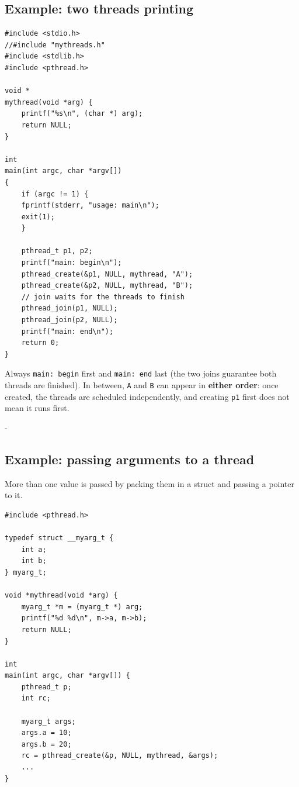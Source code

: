 \documentclass[11pt,a4paper]{article}
\makeatletter
\newcommand{\keepspace}[1]{\par\penalty-100\begingroup
  \setlength{\dimen@}{#1}\dimen@ii\pagegoal\advance\dimen@ii-\pagetotal
  \ifdim\dimen@>\dimen@ii\ifdim\dimen@ii>\z@\vfil\fi\break\fi\endgroup}
\makeatother
\begin{document}
\subsection{Example: two threads printing}

\begin{lstlisting}
#include <stdio.h>
//#include "mythreads.h"
#include <stdlib.h>
#include <pthread.h>

void *
mythread(void *arg) {
    printf("%s\n", (char *) arg);
    return NULL;
}

int
main(int argc, char *argv[])
{
    if (argc != 1) {
    fprintf(stderr, "usage: main\n");
    exit(1);
    }

    pthread_t p1, p2;
    printf("main: begin\n");
    pthread_create(&p1, NULL, mythread, "A");
    pthread_create(&p2, NULL, mythread, "B");
    // join waits for the threads to finish
    pthread_join(p1, NULL);
    pthread_join(p2, NULL);
    printf("main: end\n");
    return 0;
}
\end{lstlisting}

\begin{keybox}
Always \texttt{main: begin} first and \texttt{main: end} last (the two
joins guarantee both threads are finished). In between, \texttt{A} and
\texttt{B} can appear in \textbf{either order}: once created, the threads
are scheduled independently, and creating \texttt{p1} first does not mean
it runs first.
\end{keybox}

\keepspace{26\baselineskip}
\subsection{Example: passing arguments to a thread}

More than one value is passed by packing them in a struct and passing a
pointer to it.

\begin{lstlisting}
#include <pthread.h>

typedef struct __myarg_t {
    int a;
    int b;
} myarg_t;

void *mythread(void *arg) {
    myarg_t *m = (myarg_t *) arg;
    printf("%d %d\n", m->a, m->b);
    return NULL;
}

int
main(int argc, char *argv[]) {
    pthread_t p;
    int rc;

    myarg_t args;
    args.a = 10;
    args.b = 20;
    rc = pthread_create(&p, NULL, mythread, &args);
    ...
}
\end{lstlisting}
\end{document}
